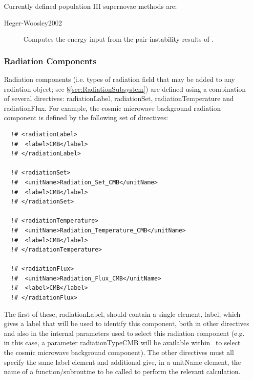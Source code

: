 Currently defined population III supernovae methods are:
\begin{description}
 \item [{\normalfont \ttfamily Heger-Woosley2002}] Computes the energy input from the pair-instability results of \cite{heger_nucleosynthetic_2002}.
\end{description}

\subsubsection{Radiation Components}\label{sec:radiationComponents}

Radiation components (i.e. types of radiation field that may be added to any radiation object; see \S\ref{sec:RadiationSubsystem}) are defined using a combination of several directives: {\normalfont \ttfamily radiationLabel}, {\normalfont \ttfamily radiationSet}, {\normalfont \ttfamily radiationTemperature} and {\normalfont \ttfamily radiationFlux}. For example, the cosmic microwave background radiation component is defined by the following set of directives:
\begin{verbatim}
  !# <radiationLabel>
  !#  <label>CMB</label>
  !# </radiationLabel>

  !# <radiationSet>
  !#  <unitName>Radiation_Set_CMB</unitName>
  !#  <label>CMB</label>
  !# </radiationSet>

  !# <radiationTemperature>
  !#  <unitName>Radiation_Temperature_CMB</unitName>
  !#  <label>CMB</label>
  !# </radiationTemperature>

  !# <radiationFlux>
  !#  <unitName>Radiation_Flux_CMB</unitName>
  !#  <label>CMB</label>
  !# </radiationFlux>
\end{verbatim}
The first of these, {\normalfont \ttfamily radiationLabel}, should contain a single element, {\normalfont \ttfamily label}, which gives a label that will be used to identify this component, both in other directives and also in the internal parameters used to select this radiation component (e.g. in this case, a parameter {\normalfont \ttfamily radiationTypeCMB} will be available within \glc\ to select the cosmic microwave background component). The other directives must all specify the same {\normalfont \ttfamily label} element and additional give, in a {\normalfont \ttfamily unitName} element, the name of a function/subroutine to be called to perform the relevant calculation.


